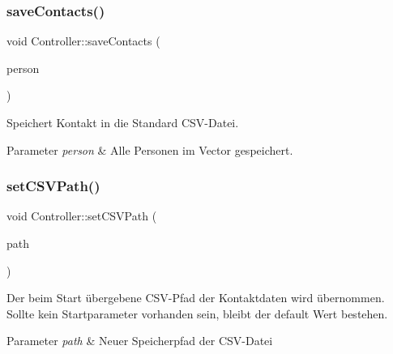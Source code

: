\subsubsection{\texorpdfstring{save\+Contacts()}{saveContacts()}}
{\footnotesize\ttfamily void Controller\+::save\+Contacts (\begin{DoxyParamCaption}\item[{vector$<$ \hyperlink{classContactManager_1_1Person}{Person} $>$ \&}]{person }\end{DoxyParamCaption})}



Speichert Kontakt in die Standard C\+S\+V-\/\+Datei.


\begin{DoxyParams}{Parameter}
{\em person} & Alle Personen im Vector gespeichert.\\
\hline
\end{DoxyParams}
\mbox{\label{classContactManager_1_1Controller_a36ae8467ae2a00a693de08f3be42cda4}} 
\subsubsection{\texorpdfstring{set\+C\+S\+V\+Path()}{setCSVPath()}}
{\footnotesize\ttfamily void Controller\+::set\+C\+S\+V\+Path (\begin{DoxyParamCaption}\item[{string}]{path }\end{DoxyParamCaption})}



Der beim Start übergebene C\+S\+V-\/\+Pfad der Kontaktdaten wird übernommen. Sollte kein Startparameter vorhanden sein, bleibt der default Wert bestehen.


\begin{DoxyParams}{Parameter}
{\em path} & Neuer Speicherpfad der C\+S\+V-\/\+Datei\\
\hline
\end{DoxyParams}
\mbox{\label{classContactManager_1_1Controller_af3f6d4b019d84eda7cd83447158cb61c}} 
